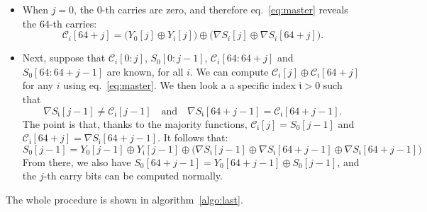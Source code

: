 \documentclass[submission,svgnames,journal=tosc]{iacrtrans}
\begin{document}
\begin{itemize}
\item When $j=0$, the $0$-th carries are zero, and therefore eq.~\eqref{eq:master}
reveals the 64-th carries:
\[
  \mathcal{C}_i[64+j] = \bigl( Y_0[j] \oplus Y_i[j] \bigr)  \oplus \bigl( \nabla S_i[j] \oplus \nabla S_i[64+j] \bigr).
\]

\item Next, suppose that $\mathcal{C}_i[0:j]$, $S_0[0:j-1]$, $\mathcal{C}_i[64:64+j]$
and $S_0[64:64+j-1]$ are known, for all $i$. We can compute
$\mathcal{C}_i[j] \oplus \mathcal{C}_i[64+j]$ for any $i$ using
eq.~\eqref{eq:master}. We then look a a specific index $\mathfrak{i} > 0$ such that
\[
   \nabla S_{\mathfrak{i}}[j-1] \neq \mathcal{C}_{\mathfrak{i}}[j-1] \quad \text{and} \quad \nabla S_{\mathfrak{i}}[64 + j-1] = \mathcal{C}_{\mathfrak{i}}[64 + j-1].
\]
The point is that, thanks to the majority functions,
$\mathcal{C}_{\mathfrak{i}}[j] = S_0[j-1]$ and
$\mathcal{C}_{\mathfrak{i}}[64+j] = \nabla S_{\mathfrak{i}}[64 + j-1]$. It follows
that:
\[
  S_0[j-1] = Y_0[j-1] \oplus Y_{\mathfrak{i}}[j-1] \oplus \bigl( \nabla S_{\mathfrak{i}}[j-1] \oplus \nabla S_{\mathfrak{i}}[64+j-1] \oplus \nabla S_{\mathfrak{i}}[64 + j-1]\bigr)
\]
From there, we also have $S_0[64+j-1] = Y_0[64+j-1] \oplus S_0[j-1]$, and the
$j$-th carry bits can be computed normally.
\end{itemize}

The whole procedure is shown in algorithm~\ref{algo:last}.
\end{document}

